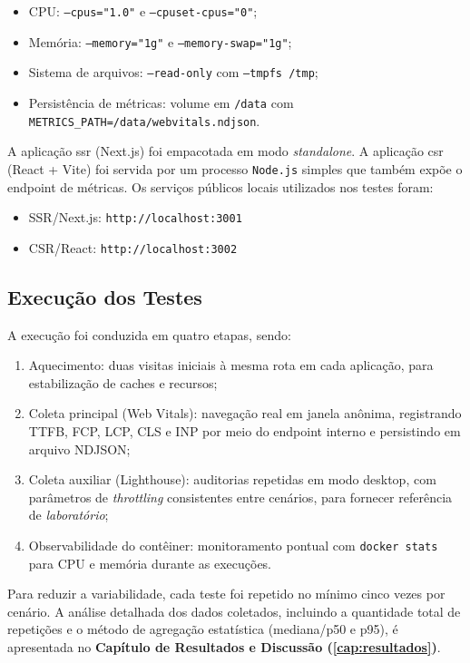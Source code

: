 \begin{itemize}
    \item CPU: \texttt{--cpus="1.0"} e \texttt{--cpuset-cpus="0"};
    \item Memória: \texttt{--memory="1g"} e \texttt{--memory-swap="1g"};
    \item Sistema de arquivos: \texttt{--read-only} com \texttt{--tmpfs /tmp};
    \item Persistência de métricas: volume em \texttt{/data} com \texttt{METRICS\_PATH=/data/webvitals.ndjson}.
\end{itemize}

A aplicação \acrshort{ssr} (Next.js) foi empacotada em modo \textit{standalone}. A aplicação \acrshort{csr} (React + Vite) foi servida por um processo \texttt{Node.js} simples que também expõe o endpoint de métricas. Os serviços públicos locais utilizados nos testes foram:
\begin{itemize}
    \item SSR/Next.js: \texttt{http://localhost:3001}
    \item CSR/React: \texttt{http://localhost:3002}
\end{itemize}

\subsection{Execução dos Testes}

A execução foi conduzida em quatro etapas, sendo:

\begin{enumerate}
    \item Aquecimento: duas visitas iniciais à mesma rota em cada aplicação, para estabilização de caches e recursos;
    \item Coleta principal (Web Vitals): navegação real em janela anônima, registrando TTFB, FCP, LCP, CLS e INP por meio do endpoint interno e persistindo em arquivo NDJSON;
    \item Coleta auxiliar (Lighthouse): auditorias repetidas em modo desktop, com parâmetros de \textit{throttling} consistentes entre cenários, para fornecer referência de \textit{laboratório};
    \item Observabilidade do contêiner: monitoramento pontual com \texttt{docker stats} para CPU e memória durante as execuções.
\end{enumerate}


Para reduzir a variabilidade, cada teste foi repetido no mínimo cinco vezes por cenário. A análise detalhada dos dados coletados, incluindo a quantidade total de repetições e o método de agregação estatística (mediana/p50 e p95), é apresentada no \textbf{Capítulo de Resultados e Discussão (\autoref{cap:resultados})}.

